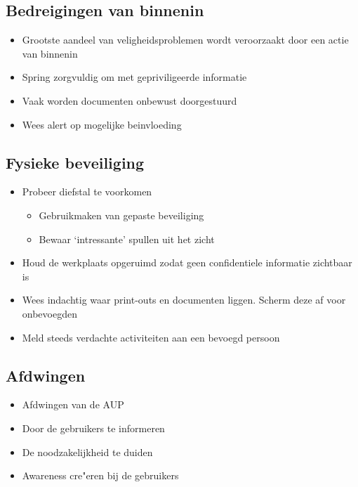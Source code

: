 \documentclass{article}
\begin{document}
\subsection{Bedreigingen van binnenin}

\begin{itemize}
    \item Grootste aandeel van veligheidsproblemen wordt veroorzaakt door een actie van binnenin
    \item Spring zorgvuldig om met gepriviligeerde informatie
    \item Vaak worden documenten onbewust doorgestuurd
    \item Wees alert op mogelijke beinvloeding
\end{itemize}

\subsection{Fysieke beveiliging}

\begin{itemize}
    \item Probeer diefstal te voorkomen
    \begin{itemize}
        \item Gebruikmaken van gepaste beveiliging
        \item Bewaar `intressante' spullen uit het zicht
    \end{itemize}
    \item Houd de werkplaats opgeruimd zodat geen confidentiele informatie zichtbaar is
    \item Wees indachtig waar print-outs en documenten liggen. Scherm deze af voor onbevoegden
    \item Meld steeds verdachte activiteiten aan een bevoegd persoon
\end{itemize}

\subsection{Afdwingen}

\begin{itemize}
    \item Afdwingen van de AUP
    \item Door de gebruikers te informeren
    \item De noodzakelijkheid te duiden
    \item Awareness cre"eren bij de gebruikers
\end{itemize}
\end{document}
